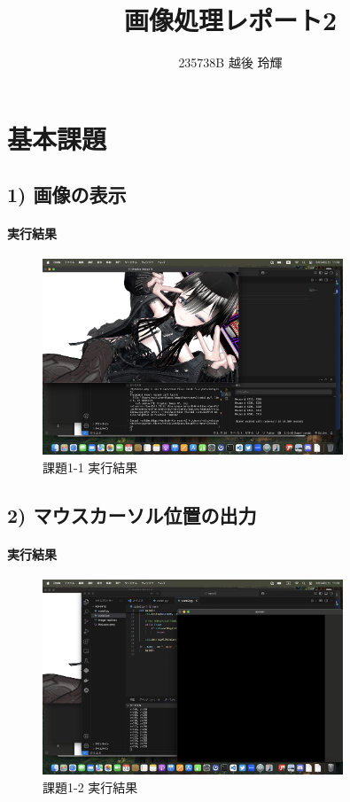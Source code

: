 \documentclass[a4paper,11pt,titlepage]{jsarticle}
\title{画像処理レポート2}
\author{235738B 越後 玲輝}
\begin{document}
\maketitle
\tableofcontents
\newpage

\section{基本課題}

\subsection{1) 画像の表示}

\paragraph{実行結果}
\begin{figure}[H]
  \centering
  \includegraphics[width=0.8\textwidth]{code1-picture.png}
  \caption{課題1-1 実行結果}
\end{figure}

\subsection{2) マウスカーソル位置の出力}

\paragraph{実行結果}
\begin{figure}[H]
  \centering
  \includegraphics[width=0.8\textwidth]{code2-picture.png}
  \caption{課題1-2 実行結果}
\end{figure}
\end{document}
